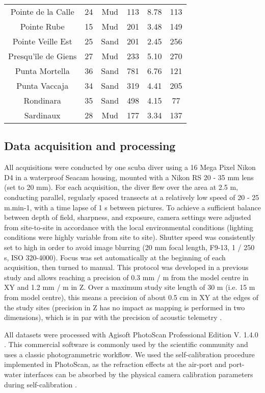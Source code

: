 \begin{table}[H]
\begin{tabular}{*{6}{c}}
        Pointe de la Calle & 24 & Mud & 113 & 8.78 & 113 \\
        Pointe Rube & 15 & Mud & 201 & 3.48 & 149 \\
        Pointe Veille Est & 25 & Sand & 201 & 2.45 & 256 \\
        Presqu’île de Giens & 27 & Mud & 233 & 5.10 & 270 \\
        Punta Mortella & 36 & Sand & 781 & 6.76 & 121 \\
        Punta Vaccaja & 34 & Sand & 319 & 4.41 & 205 \\
        Rondinara & 35 & Sand & 498 & 4.15 & 77 \\
        Sardinaux & 28 & Mud & 177 & 3.34 & 137 \\ \bottomrule
    \end{tabular}
\end{table}

\subsection{Data acquisition and processing}
All acquisitions were conducted by one scuba diver using a 16 Mega Pixel Nikon D4 in a waterproof Seacam housing, mounted with a Nikon RS 20 - 35 mm lens (set to 20 mm). For each acquisition, the diver flew over the area at 2.5 m, conducting parallel, regularly spaced transects at a relatively low speed of 20 - 25 m.min-1, with a time lapse of 1 s between pictures. To achieve a sufficient balance between depth of field, sharpness, and exposure, camera settings were adjusted from site-to-site in accordance with the local environmental conditions (lighting conditions were highly variable from site to site). Shutter speed was consistently set to high in order to avoid image blurring (20 mm focal length, F9-13, 1 / 250 s, ISO 320-4000). Focus was set automatically at the beginning of each acquisition, then turned to manual. This protocol was developed in a previous study \citep{marre_monitoring_2019} and allows reaching a precision of 0.3 mm / m from the model centre in XY and 1.2 mm / m in Z. Over a maximum study site length of 30 m (i.e. 15 m from model centre), this means a precision of about 0.5 cm in XY at the edges of the study sites (precision in Z has no impact as mapping is performed in two dimensions), which is in par with the precision of acoustic telemetry \citep{descamp_fast_2011}.

\newpage

All datasets were processed with Agisoft PhotoScan Professional Edition V. 1.4.0 \citep{agisoft_agisoft_2018-1}. This commercial software is commonly used by the scientific community \citep{figueira_accuracy_2015, burns_assessing_2016, guo_accuracy_2016, casella_mapping_2017, mizuno_simple_2017} and uses a classic photogrammetric workflow. We used the self-calibration procedure implemented in PhotoScan, as the refraction effects at the air-port and port-water interfaces can be absorbed by the physical camera calibration parameters during self-calibration \citep{shortis_calibration_2015}.

